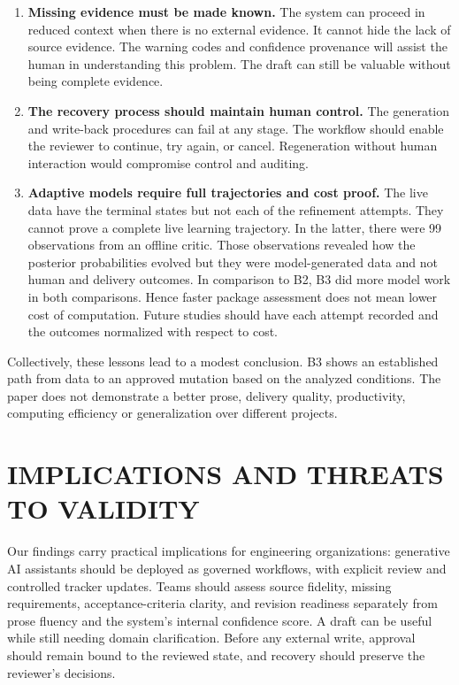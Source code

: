 \documentclass[manuscript,review]{acmart}
\begin{document}
\begin{enumerate}
  \item \textbf{Missing evidence must be made known.} The system can proceed in reduced context when there is no external evidence. It cannot hide the lack of source evidence. The warning codes and confidence provenance will assist the human in understanding this problem. The draft can still be valuable without being complete evidence.

  \item \textbf{The recovery process should maintain human control.} The generation and write-back procedures can fail at any stage. The workflow should enable the reviewer to continue, try again, or cancel. Regeneration without human interaction would compromise control and auditing.

  \item \textbf{Adaptive models require full trajectories and cost proof.} The live data have the terminal states but not each of the refinement attempts. They cannot prove a complete live learning trajectory. In the latter, there were 99 observations from an offline critic. Those observations revealed how the posterior probabilities evolved but they were model-generated data and not human and delivery outcomes. In comparison to B2, B3 did more model work in both comparisons. Hence faster package assessment does not mean lower cost of computation. Future studies should have each attempt recorded and the outcomes normalized with respect to cost.
\end{enumerate}

Collectively, these lessons lead to a modest conclusion. B3 shows an established path from data to an approved mutation based on the analyzed conditions. The paper does not demonstrate a better prose, delivery quality, productivity, computing efficiency or generalization over different projects.

\section{IMPLICATIONS AND THREATS TO VALIDITY}\label{sec:implications}
Our findings carry practical implications for engineering organizations: generative AI assistants should be deployed as governed workflows, with explicit review and controlled tracker updates. Teams should assess source fidelity, missing requirements, acceptance-criteria clarity, and revision readiness separately from prose fluency and the system's internal confidence score. A draft can be useful while still needing domain clarification. Before any external write, approval should remain bound to the reviewed state, and recovery should preserve the reviewer's decisions.
\end{document}

